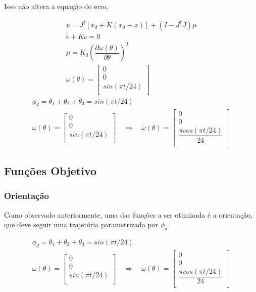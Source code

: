 \documentclass[a4paper,11pt]{article}
\theoremstyle{mytheor}
\begin{document}
Isso não altera a equação do erro.

\begin{gather*}
	\bar{u} = J^{\dagger}[\dot{x_d} + K(x_d - x)] + (I - J^{\dagger}J)\mu \\
	\dot{e} + Ke = 0 \\
	\mu = K_0\left( \dfrac{\partial \omega(\theta)}{\partial \theta} \right)^T  \\
	\omega(\theta) = 
	\begin{bmatrix} 
	0 \\
	0 \\
	sin(\pi t / 24) \\
	\end{bmatrix}
\end{gather*}
\begin{gather*}
	\phi_d = \theta_1 + \theta_2 + \theta_3 = sin(\pi t / 24) \\
	\omega(\theta) = 
	\begin{bmatrix} 
	0 \\
	0 \\
	sin(\pi t / 24) \\
	\end{bmatrix} \quad \Rightarrow \quad 
	\dot{\omega}(\theta) = 
	\begin{bmatrix} 
	0 \\
	0 \\
	\dfrac{\pi cos(\pi t / 24)}{24} \\
	\end{bmatrix}
\end{gather*}
 
\subsection{Funções Objetivo}

\subsubsection{Orientação}

Como observado anteriormente, uma das funções a ser otimizada é a orientação, que deve seguir uma trajetória parametrizada por $\phi_d$.

\begin{gather*}
	\phi_d = \theta_1 + \theta_2 + \theta_3 = sin(\pi t / 24) \\
	\omega(\theta) = 
	\begin{bmatrix} 
	0 \\
	0 \\
	sin(\pi t / 24) \\
	\end{bmatrix} \quad \Rightarrow \quad 
	\dot{\omega}(\theta) = 
	\begin{bmatrix} 
	0 \\
	0 \\
	\dfrac{\pi cos(\pi t / 24)}{24} \\
	\end{bmatrix}
\end{gather*}
\end{document}
